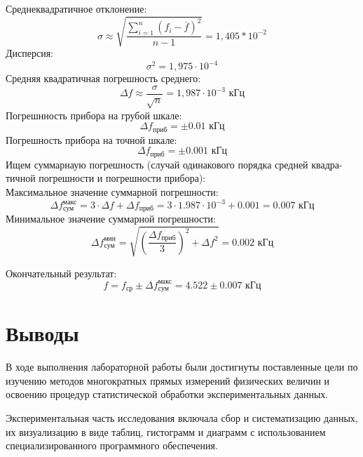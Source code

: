 \clearpage

Среднеквадратичное отклонение:
\begin{equation}
    \sigma \approx \sqrt{\frac{\sum_{i=1}^{n}(f_i-\overline{f})^{2}}{n-1}}=1,405*10^{-2}
\end{equation} 
Дисперсия:
\begin{equation}
    \sigma^2=1,975\cdot10^{-4}
\end{equation}
Средняя квадратичная погрешность среднего:
\begin{equation}
    \Delta f \approx \frac{\sigma}{\sqrt{n}}=1,987 \cdot 10^{-3} \text{ кГц}
\end{equation}
 Погрешнность прибора на грубой шкале:
\begin{equation}
    \Delta f_\text{приб} = \pm 0.01  \text{ кГц}
\end{equation}
Погрешность прибора на точной шкале:
\begin{equation}
    \Delta f_\text{приб} = \pm 0.001  \text{ кГц}
\end{equation}
Ищем суммарнаую погрешность (случай одинакового порядка средней квадра-
тичной погрешности и погрешности прибора):\\
Максимальное значение суммарной погрешности:
\begin{equation}
	\Delta f_\text{сум}^{\text{макс}} = 3 \cdot \Delta f + \Delta f_\text{приб} = 3 \cdot 1.987\cdot10^{-3} + 0.001 = 0.007 \text{ кГц}
\end{equation}
Минимальное значение суммарной погрешности:
\begin{equation}
	\Delta f_\text{сум}^{\text{мин}} = \sqrt{(\frac{\Delta f_\text{приб}}{3})^2+\Delta f ^2} = 0.002 \text{ кГц}
\end{equation}

Окончательный результат:
\begin{equation}
    f=f_\text{ср}\pm\Delta f_\text{сум}^{\text{макс}} = 4.522 \pm 0.007 \text{ кГц}
\end{equation}

\clearpage
\section{Выводы}
В ходе выполнения лабораторной работы были достигнуты поставленные цели по изучению методов многократных прямых измерений физических величин и освоению процедур статистической обработки экспериментальных данных.

Экспериментальная часть исследования включала сбор и систематизацию данных, их визуализацию в виде таблиц, гистограмм и диаграмм с использованием специализированного программного обеспечения.

